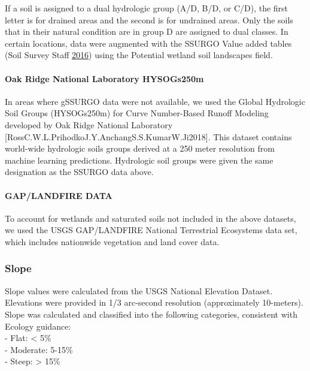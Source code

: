 \documentclass[
]{report}
\begin{document}
If a soil is assigned to a dual hydrologic group (A/D, B/D, or C/D), the first letter is for
drained areas and the second is for undrained areas. Only the soils that in their natural
condition are in group D are assigned to dual classes. In certain locations, data were augmented with the SSURGO Value added tables (Soil Survey Staff \protect\hyperlink{ref-SoilSurveyStaff2016}{2016}) using the Potential wetland soil landscapes field.

\hypertarget{oak-ridge-national-laboratory-hysogs250m}{%
\paragraph{Oak Ridge National Laboratory HYSOGs250m}\label{oak-ridge-national-laboratory-hysogs250m}}

In areas where gSSURGO data were not available, we used the Global Hydrologic Soil Groups (HYSOGs250m) for Curve Number-Based Runoff Modeling developed by Oak Ridge National Laboratory {[}RossC.W.L.PrihodkoJ.Y.AnchangS.S.KumarW.Ji2018{]}. This dataset contains world-wide hydrologic soils groups derived at a 250 meter resolution from machine learning predictions. Hydrologic soil groups were given the same designation as the SSURGO data above.

\hypertarget{gaplandfire-data}{%
\paragraph{GAP/LANDFIRE DATA}\label{gaplandfire-data}}

To account for wetlands and saturated soils not included in the above datasets, we used the USGS GAP/LANDFIRE National Terrestrial Ecosystems data set, which includes nationwide vegetation and land cover data.

\hypertarget{slope}{%
\subsubsection{Slope}\label{slope}}

Slope values were calculated from the USGS National Elevation Dataset. Elevations were provided in 1/3 arc-second resolution (approximately 10-meters). Slope was calculated and classified into the following categories, consistent with Ecology guidance:\\
- Flat: \textless{} 5\%\\
- Moderate: 5-15\%\\
- Steep: \textgreater{} 15\%
\end{document}
